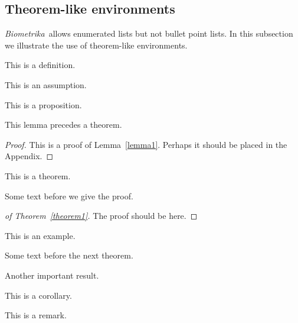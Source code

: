 \documentclass[lineno]{biometrika}
\def\Bka{{\it Biometrika}}
\begin{document}
\subsection{Theorem-like environments}

\Bka\  allows enumerated lists but not bullet point lists.
In this subsection we illustrate the use of theorem-like environments.

\begin{definition}
This is a definition.
\end{definition}

\begin{assumption}
\label{assumptionA}
This is an assumption.
\end{assumption}

\begin{proposition}
This is a proposition.
\end{proposition}

\begin{lemma}
\label{lemma1}
This lemma precedes a theorem.
\end{lemma}

\begin{proof}
This is a proof of Lemma~\ref{lemma1}.  Perhaps it should be placed in the Appendix.
\end{proof}

\begin{theorem}
\label{theorem1}
This is a theorem.
\end{theorem}

Some text before we give the proof.

\begin{proof}[of Theorem~\ref{theorem1}]
The proof should be here.
\end{proof}

\begin{example}
This is an example.
\end{example}

Some text before the next theorem.

\begin{theorem}
Another important result.
\end{theorem}

\begin{corollary}
This is a corollary.
\end{corollary}

\begin{remark}
This is a remark.
\end{remark}
\end{document}

